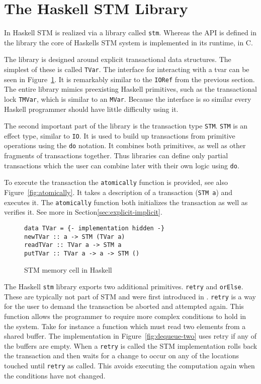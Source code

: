 \section{The Haskell STM Library}

\label{sec:library}

In Haskell STM is realized via a library called \texttt{stm}. Whereas the API is
defined in the library the core of Haskells STM system is implemented in its
runtime, in C.

The library is designed around explicit transactional data structures. The
simplest of these is called \texttt{TVar}. The interface for interacting with a
tvar can be seen in Figure~\ref{fig:tvar}. It is remarkably similar to the
\texttt{IORef} from the previous section. The entire library mimics preexisting
Haskell primitives, such as the transactional lock \texttt{TMVar}, which is
similar to an \texttt{MVar}. Because the interface is so similar every Haskell
programmer should have little difficulty using it.

The second important part of the library is the transaction type \texttt{STM}.
\texttt{STM} is an effect type, similar to \texttt{IO}. It is used to build up
transactions from primitive operations using the \texttt{do} notation. It
combines both primitives, as well as other fragments of transactions together.
Thus libraries can define only partial transactions which the user can combine
later with their own logic using \texttt{do}.

To execute the transaction the \texttt{atomically} function is provided, see
also Figure~\ref{fig:atomically}. It takes a description of a transaction
(\texttt{STM a}) and executes it. The \texttt{atomically} function both
initializes the transaction as well as verifies it. See more in
Section\ref{sec:explicit-implicit}.

\begin{figure}
  \begin{lstlisting}
data TVar = {- implementation hidden -}
newTVar :: a -> STM (TVar a)
readTVar :: TVar a -> STM a
putTVar :: TVar a -> a -> STM ()
  \end{lstlisting}
  \caption{STM memory cell in Haskell}
  \label{fig:tvar}
\end{figure}

The Haskell \texttt{stm} library exports two additional primitives.
\texttt{retry} and \texttt{orElse}. These are typically not part of STM and were
first introduced in \cite{composable-transactions}. \texttt{retry} is a way for
the user to demand the transaction be aborted and attempted again. This function
allows the programmer to require more complex conditions to hold in the system.
Take for instance a function which must read two elements from a shared buffer.
The implementation in Figure~\ref{fig:dequeue-two} uses retry if any of the
buffers are empty. When a \texttt{retry} is called the STM implementation rolls
back the transaction and then waits for a change to occur on any of the
locations touched until \texttt{retry} as called. This avoids executing the
computation again when the conditions have not changed.

